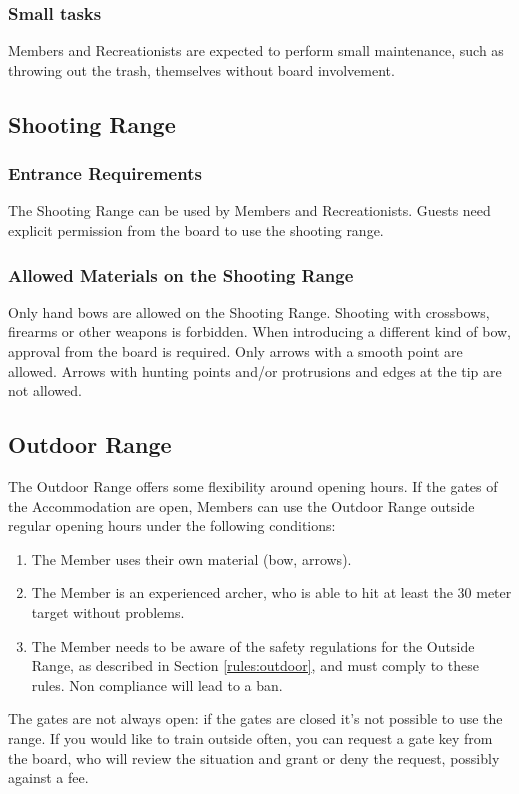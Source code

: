\documentclass[a4paper]{article}
\begin{document}
\subsubsection{Small tasks}
Members and Recreationists are expected to perform small maintenance, such as throwing out the trash, themselves without board involvement.

\subsection{Shooting Range}
\subsubsection{Entrance Requirements}
The Shooting Range can be used by Members and Recreationists. Guests need explicit permission from the board to use the shooting range. 

\subsubsection{Allowed Materials on the Shooting Range}
Only hand bows are allowed on the Shooting Range. Shooting with crossbows, firearms or other weapons is forbidden. When introducing a different kind of bow, approval from the board is required. Only arrows with a smooth point are allowed. Arrows with hunting points and/or protrusions and edges at the tip are not allowed.

\subsection{Outdoor Range}
The Outdoor Range offers some flexibility around opening hours. If the gates of the Accommodation are open, Members can use the Outdoor Range outside regular opening hours under the following conditions:

\begin{enumerate}
\item The Member uses their own material (bow, arrows).
\item The Member is an experienced archer, who is able to hit at least the 30 meter target without problems.
\item The Member needs to be aware of the safety regulations for the Outside Range, as described in Section \ref{rules:outdoor}, and must comply to these rules. Non compliance will lead to a ban.
\end{enumerate}

The gates are not always open: if the gates are closed it’s not possible to use the range. If you would like to train outside often, you can request a gate key from the board, who will review the situation and grant or deny the request, possibly against a fee. \\
\end{document}

